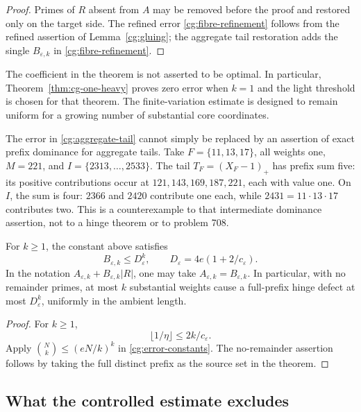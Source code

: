 \begin{proof}
Primes of \(R\) absent from \(A\) may be removed before the proof
and restored only on the target side. The refined error
\eqref{cg:fibre-refinement} follows from the refined assertion of
Lemma~\ref{cg:gluing}; the aggregate tail restoration adds the
single \(B_{\varepsilon,k}\) in \eqref{cg:fibre-refinement}.
\end{proof}

The coefficient in the theorem is not asserted to be optimal.
In particular, Theorem~\ref{thm:cg-one-heavy} proves zero error
when \(k=1\) and the light threshold is chosen for that theorem.
The finite-variation estimate is designed to remain uniform for a
growing number of substantial core coordinates.

The error in \eqref{cg:aggregate-tail} cannot simply be replaced by
an assertion of exact prefix dominance for aggregate tails. Take
\(F=\{11,13,17\}\), all weights one, \(M=221\), and
\(I=\{2313,\ldots,2533\}\). The tail
\(T_F=(X_F-1)_+\) has prefix sum five: its positive contributions
occur at \(121,143,169,187,221\), each with value one. On \(I\),
the sum is four: \(2366\) and \(2420\) contribute one each, while
\(2431=11\cdot13\cdot17\) contributes two. This is a counterexample
to that intermediate dominance assertion, not to a hinge theorem
or to problem 708.

\begin{corollary}
\label{cg:error-growth}
For \(k\ge1\), the constant above satisfies
\begin{equation}
 B_{\varepsilon,k}\le D_\varepsilon^k,\qquad
 D_\varepsilon=4e(1+2/c_\varepsilon).
 \label{cg:quantitative-errors}
\end{equation}
In the notation \(A_{\varepsilon,k}+B_{\varepsilon,k}|R|\),
one may take \(A_{\varepsilon,k}=B_{\varepsilon,k}\).
In particular, with no remainder primes, at most \(k\) substantial
weights cause a full-prefix hinge defect at most \(D_\varepsilon^k\),
uniformly in the ambient length.
\end{corollary}

\begin{proof}
For \(k\ge1\),
\[
 \lfloor1/\eta\rfloor\le2k/c_\varepsilon.
\]
Apply \(\binom Nk\le(eN/k)^k\) in
\eqref{cg:error-constants}. The no-remainder assertion follows
by taking the full distinct prefix as the source set in the theorem.
\end{proof}

\subsection{What the controlled estimate excludes}

